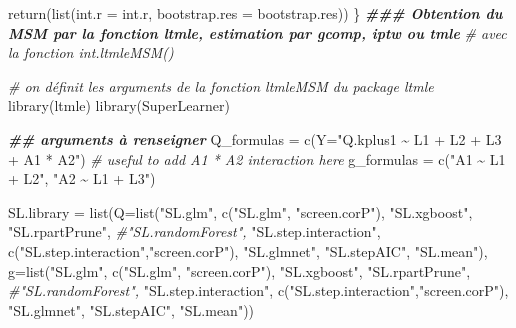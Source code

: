 \documentclass[
]{book}
\newenvironment{Shaded}{\begin{snugshade}}{\end{snugshade}}
\newcommand{\AttributeTok}[1]{\textcolor[rgb]{0.77,0.63,0.00}{#1}}
\newcommand{\CommentTok}[1]{\textcolor[rgb]{0.56,0.35,0.01}{\textit{#1}}}
\newcommand{\DocumentationTok}[1]{\textcolor[rgb]{0.56,0.35,0.01}{\textbf{\textit{#1}}}}
\newcommand{\FunctionTok}[1]{\textcolor[rgb]{0.00,0.00,0.00}{#1}}
\newcommand{\NormalTok}[1]{#1}
\newcommand{\OtherTok}[1]{\textcolor[rgb]{0.56,0.35,0.01}{#1}}
\newcommand{\StringTok}[1]{\textcolor[rgb]{0.31,0.60,0.02}{#1}}
\begin{document}
\begin{Shaded}
\begin{Highlighting}[]
  \FunctionTok{return}\NormalTok{(}\FunctionTok{list}\NormalTok{(}\AttributeTok{int.r =}\NormalTok{ int.r,}
              \AttributeTok{bootstrap.res =}\NormalTok{ bootstrap.res))}
\NormalTok{\}}
\DocumentationTok{\#\#\# Obtention du MSM par la fonction ltmle, estimation par gcomp, iptw ou tmle}
\CommentTok{\# avec la fonction int.ltmleMSM()}

\CommentTok{\# on définit les arguments de la fonction ltmleMSM du package ltmle}
\FunctionTok{library}\NormalTok{(ltmle)}
\FunctionTok{library}\NormalTok{(SuperLearner)}

\DocumentationTok{\#\# arguments à renseigner}
\NormalTok{Q\_formulas }\OtherTok{=} \FunctionTok{c}\NormalTok{(}\AttributeTok{Y=}\StringTok{"Q.kplus1 \textasciitilde{} L1 + L2 + L3 + A1 * A2"}\NormalTok{) }\CommentTok{\# useful to add A1 * A2 interaction here}
\NormalTok{g\_formulas }\OtherTok{=} \FunctionTok{c}\NormalTok{(}\StringTok{"A1 \textasciitilde{} L1 + L2"}\NormalTok{,}
               \StringTok{"A2 \textasciitilde{} L1 + L3"}\NormalTok{)}

\NormalTok{SL.library }\OtherTok{=} \FunctionTok{list}\NormalTok{(}\AttributeTok{Q=}\FunctionTok{list}\NormalTok{(}\StringTok{"SL.glm"}\NormalTok{, }\FunctionTok{c}\NormalTok{(}\StringTok{"SL.glm"}\NormalTok{, }\StringTok{"screen.corP"}\NormalTok{),}
                         \StringTok{"SL.xgboost"}\NormalTok{, }\StringTok{"SL.rpartPrune"}\NormalTok{, }\CommentTok{\#"SL.randomForest",}
                         \StringTok{"SL.step.interaction"}\NormalTok{, }\FunctionTok{c}\NormalTok{(}\StringTok{"SL.step.interaction"}\NormalTok{,}\StringTok{"screen.corP"}\NormalTok{),}
                         \StringTok{"SL.glmnet"}\NormalTok{, }\StringTok{"SL.stepAIC"}\NormalTok{,}
                         \StringTok{"SL.mean"}\NormalTok{),}
                  \AttributeTok{g=}\FunctionTok{list}\NormalTok{(}\StringTok{"SL.glm"}\NormalTok{,  }\FunctionTok{c}\NormalTok{(}\StringTok{"SL.glm"}\NormalTok{, }\StringTok{"screen.corP"}\NormalTok{),}
                         \StringTok{"SL.xgboost"}\NormalTok{, }\StringTok{"SL.rpartPrune"}\NormalTok{, }\CommentTok{\#"SL.randomForest",}
                         \StringTok{"SL.step.interaction"}\NormalTok{, }\FunctionTok{c}\NormalTok{(}\StringTok{"SL.step.interaction"}\NormalTok{,}\StringTok{"screen.corP"}\NormalTok{),}
                         \StringTok{"SL.glmnet"}\NormalTok{, }\StringTok{"SL.stepAIC"}\NormalTok{,}
                         \StringTok{"SL.mean"}\NormalTok{))}


\end{Highlighting}
\end{Shaded}
\end{document}
